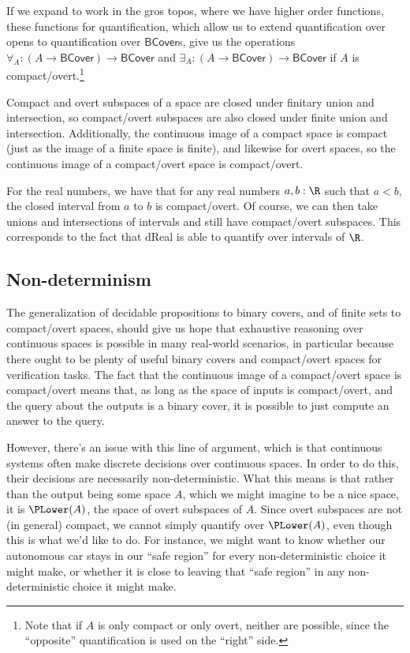 If we expand to work in the gros topos, where we have higher order functions, these functions for quantification, which allow us to extend quantification over opens to quantification over $\mathsf{BCover}$s, give us the operations $\forall_A : (A \to \mathsf{BCover}) \to \mathsf{BCover}$ and $\exists_A : (A \to \mathsf{BCover}) \to \mathsf{BCover}$ if $A$ is compact/overt.\footnote{Note that if $A$ is only compact or only overt, neither are possible, since the ``opposite'' quantification is used on the ``right'' side.}

Compact and overt subspaces of a space are closed under finitary union and intersection, so compact/overt subspaces are also closed under finite union and intersection. Additionally, the continuous image of a compact space is compact (just as the image of a finite space is finite), and likewise for overt spaces, so the continuous image of a compact/overt space is compact/overt.

For the real numbers, we have that for any real numbers $a, b : \R$ such that $a < b$, the closed interval from $a$ to $b$ is compact/overt. Of course, we can then take unions and intersections of intervals and still have compact/overt subspaces. This corresponds to the fact that dReal is able to quantify over intervals of $\R$.

\subsection{Non-determinism}

The generalization of decidable propositions to binary covers, and of finite sets to compact/overt spaces, should give us hope that exhaustive reasoning over continuous spaces is possible in many real-world scenarios, in particular because there ought to be plenty of useful binary covers and compact/overt spaces for verification tasks. The fact that the continuous image of a compact/overt space is compact/overt means that, as long as the space of inputs is compact/overt, and the query about the outputs is a binary cover, it is possible to just compute an answer to the query.

However, there's an issue with this line of argument, which is that continuous systems often make discrete decisions over continuous spaces. In order to do this, their decisions are necessarily non-deterministic. What this means is that rather than the output being some space $A$, which we might imagine to be a nice space, it is $\PLower(A)$, the space of overt subspaces of $A$. Since overt subspaces are not (in general) compact, we cannot simply quantify over $\PLower(A)$, even though this is what we'd like to do. For instance, we might want to know whether our autonomous car stays in our ``safe region'' for every non-deterministic choice it might make, or whether it is close to leaving that ``safe region'' in any non-deterministic choice it might make.

